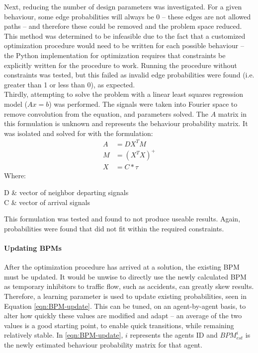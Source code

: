 \documentclass{report}
\makeatletter
\newenvironment{conditions*}
  {\par\vspace{\abovedisplayskip}\noindent\begin{tabular}{>{$}l<{$} @{${}={}$} l}}
  {\end{tabular}\par\vspace{\belowdisplayskip}}
\makeatother
\begin{document}
Next, reducing the number of design parameters was investigated. 
For a given behaviour, some edge probabilities will always be 0 – these edges are not allowed paths – and therefore these could be removed and the problem space reduced. 
This method was determined to be infeasible due to the fact that a customized optimization procedure would need to be written for each possible behaviour – the Python implementation for optimization requires that constraints be explicitly written for the procedure to work. 
Running the procedure without constraints was tested, but this failed as invalid edge probabilities were found (i.e. greater than 1 or less than 0), as expected. \\

Thirdly, attempting to solve the problem with a linear least squares regression model ($Ax=b$) was performed. 
The signals were taken into Fourier space to remove convolution from the equation, and parameters solved. 
The $A$ matrix in this formulation is unknown and represents the behaviour probability matrix. 
It was isolated and solved for with the formulation: \\

\begin{align}
	A& = DX^{T}M \\
	M& = (X^{T}X)^{+} \\
	X& = C \ast \tau
\end{align}
Where:
\begin{conditions*}
D & vector of neighbor departing signals \\
C & vector of arrival signals
\end{conditions*}

This formulation was tested and found to not produce useable results. 
Again, probabilities were found that did not fit within the required constraints.\\

\paragraph{Updating BPMs}
After the optimization procedure has arrived at a solution, the existing BPM must be updated. 
It would be unwise to directly use the newly calculated BPM as temporary inhibitors to traffic flow, such as accidents, can greatly skew results. 
Therefore, a learning parameter is used to update existing probabilities, seen in Equation \eqref{eqn:BPM-update}. 
This can be tuned, on an agent-by-agent basis, to alter how quickly these values are modified and adapt – an average of the two values is a good starting point, to enable quick transitions, while remaining relatively stable. 
In \eqref{eqn:BPM-update}, $i$ represents the agents ID and $BPM_{est}^{i}$ is the newly estimated behaviour probability matrix for that agent.
\end{document}
